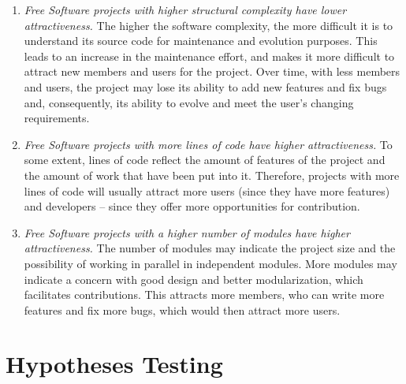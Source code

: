 \documentclass[conference]{IEEEtran}
\begin{document}
\begin{enumerate}
\item \emph{Free Software projects with higher structural complexity have
lower attractiveness.}
%
The higher the software complexity, the more difficult it is to understand
its source code for maintenance and evolution purposes.
%
This leads to an increase in the maintenance effort, and makes it more
difficult to attract new members and users for the project.
%
Over time, with less members and users, the project may lose its ability to
add new features and fix bugs and, consequently, its ability to evolve and meet
the user's changing requirements.

\item \emph{Free Software projects with more lines of code have
higher attractiveness.}
%
To some extent, lines of code reflect the amount of features of the project and
the amount of work that have been put into it.
%
Therefore, projects with more lines of code will usually attract more users
(since they have more features) and developers -- since they offer more 
opportunities for contribution.

\item \emph{Free Software projects with a higher number of modules have
higher attractiveness.}
%
The number of modules may indicate the project size and the possibility
of working in parallel in independent modules.
%
More modules may indicate a concern with good design and better modularization,
which facilitates contributions.
%
This attracts more members, who can write more features and fix more bugs,
which would then attract more users.
\end{enumerate}


\section{Hypotheses Testing}   
\label{hypothesesTesting}
\end{document}
